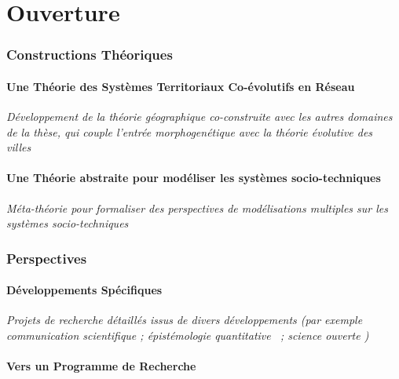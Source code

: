

\part{Ouverture}


\section{Constructions Théoriques}

\subsection{Une Théorie des Systèmes Territoriaux Co-évolutifs en Réseau}

\textit{Développement de la théorie géographique co-construite avec les autres domaines de la thèse, qui couple l'entrée morphogenétique avec la théorie évolutive des villes~\cite{raimbault:halshs-01422484}}


\subsection{Une Théorie abstraite pour modéliser les systèmes socio-techniques}

\textit{Méta-théorie pour formaliser des perspectives de modélisations multiples sur les systèmes socio-techniques} 


\section{Perspectives}

\subsection{Développements Spécifiques}

\textit{Projets de recherche détaillés issus de divers développements (par exemple communication scientifique 
\cite{serra2016game} ; épistémologie quantitative~\cite{raimbault2016techno} ; science ouverte
\cite{cybergeo20})}

\subsection{Vers un Programme de Recherche}

